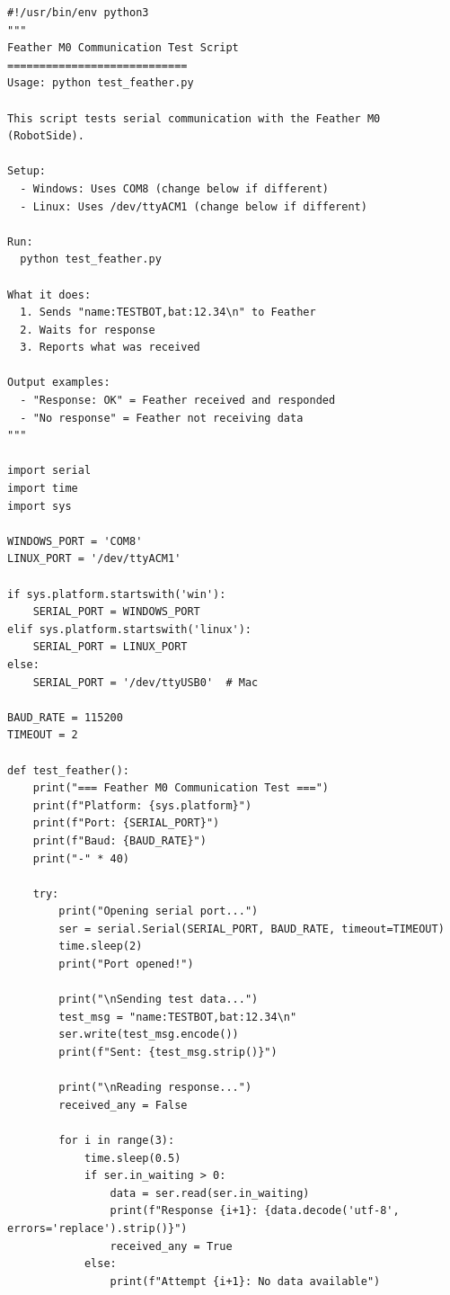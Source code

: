 \begin{lstlisting}[style=appendix-py, caption={Feather serial-communication test}, label={lst:test-feather}]
#!/usr/bin/env python3
"""
Feather M0 Communication Test Script
============================
Usage: python test_feather.py

This script tests serial communication with the Feather M0 (RobotSide).

Setup:
  - Windows: Uses COM8 (change below if different)
  - Linux: Uses /dev/ttyACM1 (change below if different)

Run:
  python test_feather.py

What it does:
  1. Sends "name:TESTBOT,bat:12.34\n" to Feather
  2. Waits for response
  3. Reports what was received

Output examples:
  - "Response: OK" = Feather received and responded
  - "No response" = Feather not receiving data
"""

import serial
import time
import sys

WINDOWS_PORT = 'COM8'
LINUX_PORT = '/dev/ttyACM1'

if sys.platform.startswith('win'):
    SERIAL_PORT = WINDOWS_PORT
elif sys.platform.startswith('linux'):
    SERIAL_PORT = LINUX_PORT
else:
    SERIAL_PORT = '/dev/ttyUSB0'  # Mac

BAUD_RATE = 115200
TIMEOUT = 2

def test_feather():
    print("=== Feather M0 Communication Test ===")
    print(f"Platform: {sys.platform}")
    print(f"Port: {SERIAL_PORT}")
    print(f"Baud: {BAUD_RATE}")
    print("-" * 40)

    try:
        print("Opening serial port...")
        ser = serial.Serial(SERIAL_PORT, BAUD_RATE, timeout=TIMEOUT)
        time.sleep(2)
        print("Port opened!")

        print("\nSending test data...")
        test_msg = "name:TESTBOT,bat:12.34\n"
        ser.write(test_msg.encode())
        print(f"Sent: {test_msg.strip()}")

        print("\nReading response...")
        received_any = False
        
        for i in range(3):
            time.sleep(0.5)
            if ser.in_waiting > 0:
                data = ser.read(ser.in_waiting)
                print(f"Response {i+1}: {data.decode('utf-8', errors='replace').strip()}")
                received_any = True
            else:
                print(f"Attempt {i+1}: No data available")


\end{lstlisting}
